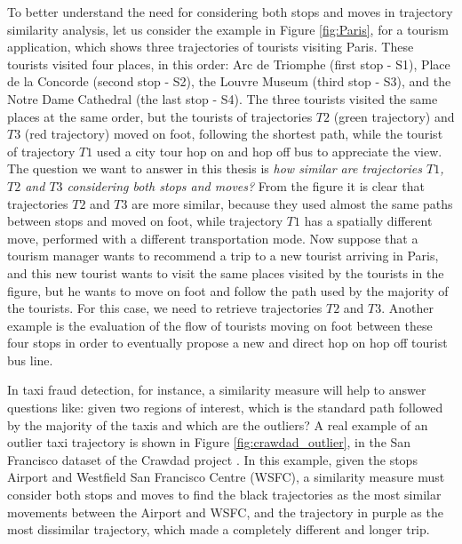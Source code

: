 {To better understand the need for considering both stops and moves in trajectory similarity analysis, let us consider the example in Figure \ref{fig:Paris}, for a tourism application, which shows three trajectories of tourists visiting Paris. These tourists visited four places, in this order:  Arc de Triomphe (first stop - S1), Place de la Concorde (second stop - S2), the Louvre Museum (third stop - S3), and the Notre Dame Cathedral (the last stop - S4). The three tourists visited the same places at the same order, but the tourists of trajectories $T2$ (green trajectory) and $T3$ (red trajectory) moved on foot, following the shortest path, while the tourist of trajectory $T1$ used a city tour hop on and hop off bus to appreciate the view. The question we want to answer in this thesis is \emph{how similar are trajectories $T1$, $T2$ and $T3$ considering both stops and moves?} From the figure it is clear that trajectories $T2$ and $T3$ are more similar, because they used almost the same paths between stops and moved on foot, while trajectory $T1$ has a spatially different move, performed with a different transportation mode. Now suppose that a tourism manager wants to recommend a trip to a new tourist arriving in Paris, and this new tourist wants to visit the same places visited by the tourists in the figure, but he wants to move on foot and follow the path used by the majority of the tourists.
For this case, we need to retrieve trajectories $T2$ and $T3$. 
Another example is the evaluation of the flow of tourists moving on foot between these four stops in order to eventually propose a new and direct hop on hop off tourist bus line.}

{In taxi fraud detection, for instance, a similarity measure will help to answer questions like: given two regions of interest, which is the standard path followed by the majority of the taxis and which are the outliers?
A real example of an outlier taxi trajectory is shown in Figure {\ref{fig:crawdad_outlier}}, in the San Francisco dataset of the Crawdad project} \cite{epfl-mobility-20090224}. {In this example, given the stops Airport and  Westfield San Francisco Centre (WSFC), a similarity measure must consider both stops and moves to find the black trajectories as the most similar movements between the Airport and WSFC, and the trajectory in purple as the most dissimilar trajectory, which made a completely different and longer trip.}
 
